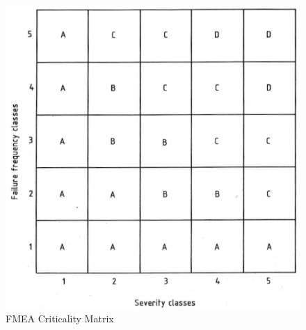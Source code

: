 \documentclass[./dissertation.tex]{subfiles}
\begin{document}
\begin{figure}
	\includegraphics[width=\linewidth]{subfiles/imgs/fmea_criticality_matrix_with_bands.png}
  \caption{FMEA Criticality Matrix}
  \label{fig:criticality_matrix}
\end{figure}
\end{document}
